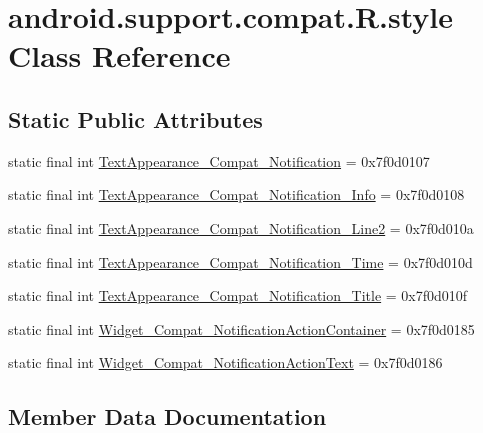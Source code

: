 \hypertarget{classandroid_1_1support_1_1compat_1_1R_1_1style}{}\section{android.\+support.\+compat.\+R.\+style Class Reference}
\label{classandroid_1_1support_1_1compat_1_1R_1_1style}
\subsection*{Static Public Attributes}
\begin{DoxyCompactItemize}
\item 
static final int \mbox{\hyperlink{classandroid_1_1support_1_1compat_1_1R_1_1style_a114bcc978aa842e6026fad3862e972cd}{Text\+Appearance\+\_\+\+Compat\+\_\+\+Notification}} = 0x7f0d0107
\item 
static final int \mbox{\hyperlink{classandroid_1_1support_1_1compat_1_1R_1_1style_acda26018c1c14a2dd848265ecdfb8222}{Text\+Appearance\+\_\+\+Compat\+\_\+\+Notification\+\_\+\+Info}} = 0x7f0d0108
\item 
static final int \mbox{\hyperlink{classandroid_1_1support_1_1compat_1_1R_1_1style_a98eb833a2bc193d11c113fe9ee60f585}{Text\+Appearance\+\_\+\+Compat\+\_\+\+Notification\+\_\+\+Line2}} = 0x7f0d010a
\item 
static final int \mbox{\hyperlink{classandroid_1_1support_1_1compat_1_1R_1_1style_a9110f81c0af6e7ed7ed66ed98149faef}{Text\+Appearance\+\_\+\+Compat\+\_\+\+Notification\+\_\+\+Time}} = 0x7f0d010d
\item 
static final int \mbox{\hyperlink{classandroid_1_1support_1_1compat_1_1R_1_1style_a69cbbd95c58f257549c36761ad56924e}{Text\+Appearance\+\_\+\+Compat\+\_\+\+Notification\+\_\+\+Title}} = 0x7f0d010f
\item 
static final int \mbox{\hyperlink{classandroid_1_1support_1_1compat_1_1R_1_1style_a8f7c61994ed511066c8c667648fd269b}{Widget\+\_\+\+Compat\+\_\+\+Notification\+Action\+Container}} = 0x7f0d0185
\item 
static final int \mbox{\hyperlink{classandroid_1_1support_1_1compat_1_1R_1_1style_a96ff4cd097ce36adea6f4badafde3416}{Widget\+\_\+\+Compat\+\_\+\+Notification\+Action\+Text}} = 0x7f0d0186
\end{DoxyCompactItemize}


\subsection{Member Data Documentation}
\mbox{\label{classandroid_1_1support_1_1compat_1_1R_1_1style_a114bcc978aa842e6026fad3862e972cd}} 
